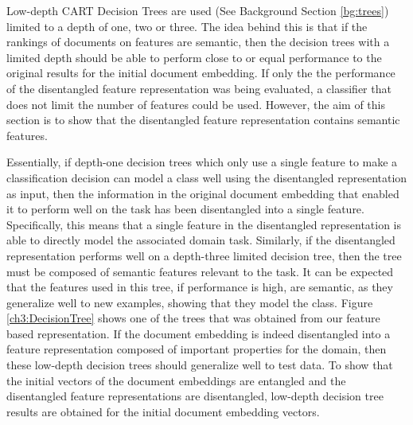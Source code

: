 Low-depth  CART Decision Trees  are used (See Background Section \ref{bg:trees}) limited to a depth of one, two or three. The idea behind this is that if the rankings of documents on features are semantic, then the decision trees with a limited depth should be able to perform close to or equal performance to the original results for the initial document embedding.  If only the the performance of the disentangled feature representation was being evaluated, a classifier that does not limit the number of features could be used. However, the aim of this section is to show that the disentangled feature representation contains semantic features. 

Essentially, if depth-one decision trees  which only use a single feature to make a classification decision can model a class well using the disentangled representation as input, then the information in  the original document embedding that enabled it to perform well on the task has been disentangled into a single feature. Specifically, this means that a single feature in the disentangled representation is able to directly model the associated domain task. Similarly, if the disentangled representation performs well on a depth-three limited decision tree, then the tree must be composed of semantic features relevant to the task. It can be expected that the features used in this tree, if performance is high, are semantic, as they generalize well to new examples, showing that they model the class.   Figure \ref{ch3:DecisionTree} shows one of the trees that was obtained from our feature based representation.  If the document embedding is indeed disentangled into a feature representation composed of important properties for the domain, then these low-depth decision trees should generalize well to test data. To show that the initial vectors of the document embeddings are entangled and the disentangled feature representations are disentangled, low-depth decision tree results are  obtained for the initial document embedding vectors. 




